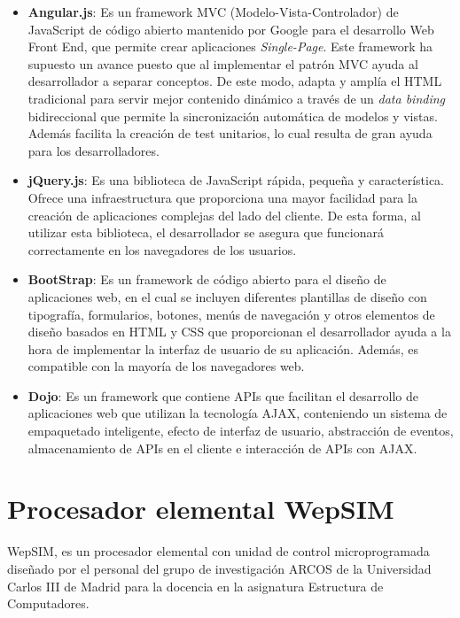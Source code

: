 \begin{itemize}

\item \textbf{Angular.js}: Es un framework MVC (Modelo-Vista-Controlador) de JavaScript de código abierto mantenido por Google para el desarrollo Web Front End, que permite crear aplicaciones \textit{Single-Page}. Este framework ha supuesto un avance puesto que al implementar el patrón MVC ayuda al desarrollador a separar conceptos. De este modo, adapta y amplía el HTML tradicional para servir mejor contenido dinámico a través de un \textit{data binding} bidireccional que permite la sincronización automática de modelos y vistas. Además facilita la creación de test unitarios, lo cual resulta de gran ayuda para los desarrolladores.

\item \textbf{jQuery.js}: Es una biblioteca de JavaScript rápida, pequeña y característica. Ofrece una infraestructura que proporciona una mayor facilidad para la creación de aplicaciones complejas del lado del cliente. De esta forma, al utilizar esta biblioteca, el desarrollador se asegura que funcionará correctamente en los navegadores de los usuarios.

\item \textbf{BootStrap}: Es un framework de código abierto para el diseño de aplicaciones web, en el cual se incluyen diferentes plantillas de diseño con tipografía, formularios, botones, menús de navegación y otros elementos de diseño basados en HTML y CSS que proporcionan el desarrollador ayuda a la hora de implementar la interfaz de usuario de su aplicación. Además, es compatible con la mayoría de los navegadores web.

\item \textbf{Dojo}: Es un framework que contiene APIs que facilitan el desarrollo de aplicaciones web que utilizan la tecnología AJAX, conteniendo un sistema de empaquetado inteligente, efecto de interfaz de usuario, abstracción de eventos, almacenamiento de APIs en el cliente e interacción de APIs con AJAX.

\end{itemize}

\section{Procesador elemental WepSIM}
\label{sec:wepsim}

WepSIM, es un procesador elemental con unidad de control microprogramada diseñado por el personal del grupo de investigación ARCOS de la Universidad Carlos III de Madrid para la docencia en la asignatura Estructura de Computadores.

